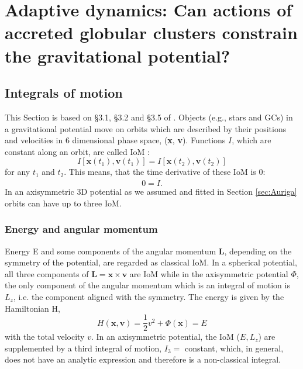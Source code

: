 \section[Adaptive dynamics]{Adaptive dynamics: Can actions of accreted globular clusters constrain the gravitational potential?}\label{sec:Dynamics}

\subsection{Integrals of motion}\label{subsec:IoMs}
This Section is based on \S3.1, \S3.2 and \S3.5 of \citet{Binney...Tremaine...2008}. Objects (e.g., stars and \acp{GC}) in a gravitational potential move on orbits which are described by their positions and velocities in 6 dimensional phase space, (\textbf{x}, \textbf{v}). Functions $I$, which are constant along an orbit, are called \acf{IoM} \citep{Binney...Tremaine...2008}:
\begin{equation}
    I[\mathbf{x}(t_1), \mathbf{v}(t_1)] = I[\mathbf{x}(t_2), \mathbf{v}(t_2)]
\end{equation}
for any $t_1$ and $t_2$. This means, that the time derivative of these \ac{IoM} is 0:
\begin{equation}\label{eq:der_IoM}
    0 = \dot{I}.
\end{equation}
In an axisymmetric 3D potential as we assumed and fitted in Section \ref{sec:Auriga} orbits can have up to three \ac{IoM}. 
\subsubsection{Energy and angular momentum}
Energy E and some components of the angular momentum \textbf{L}, depending on the symmetry of the potential, are regarded as classical \ac{IoM}. In a spherical potential, all three components of $\textbf{L} = \textbf{x} \times \textbf{v}$ are \ac{IoM} while in the axisymmetric potential $\Phi$, the only component of the angular momentum which is an integral of motion is $L_z$, i.e. the component aligned with the symmetry. The energy is given by the Hamiltonian H,
\begin{equation}\label{eq:energy_hamiltonian}
    H(\mathbf{x, v}) = \frac{1}{2}v^2 + \Phi(\mathbf{x}) = E
\end{equation}
with the total velocity $v$. In an axisymmetric potential, the \ac{IoM} ($E,L_z$) are supplemented by a third integral of motion, $I_3 =$ constant, which, in general, does not have an analytic expression and therefore is a non-classical integral. 
